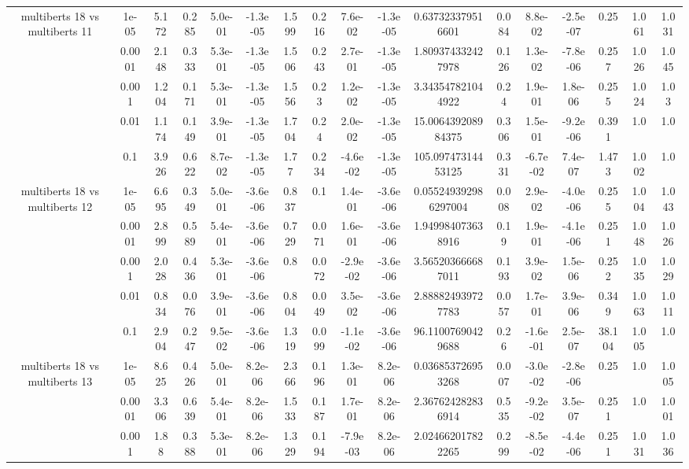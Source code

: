 \begin{tabular}{|c|c|c|c|c|c|c|c|c|c|c|c|c|c|c|c|c|}
\hline
\multirow{5}{*}{multiberts 18 vs multiberts 11} & 1e-05 & 5.172 & 0.285 & 5.0e-01 & -1.3e-05 & 1.599 & 0.216 & 7.6e-02 & -1.3e-05 & 0.637323379516601 & 0.084 & 8.8e-02 & -2.5e-07 & 0.25 & 1.061 & 1.031 \\
 & 0.0001 & 2.148 & 0.333 & 5.3e-01 & -1.3e-05 & 1.506 & 0.243 & 2.7e-01 & -1.3e-05 & 1.809374332427978 & 0.126 & 1.3e-02 & -7.8e-06 & 0.257 & 1.026 & 1.045 \\
 & 0.001 & 1.204 & 0.171 & 5.3e-01 & -1.3e-05 & 1.556 & 0.23 & 1.2e-02 & -1.3e-05 & 3.343547821044922 & 0.24 & 1.9e-01 & 1.8e-06 & 0.255 & 1.024 & 1.03 \\
 & 0.01 & 1.174 & 0.149 & 3.9e-01 & -1.3e-05 & 1.704 & 0.24 & 2.0e-02 & -1.3e-05 & 15.006439208984375 & 0.306 & 1.5e-01 & -9.2e-06 & 0.391 & 1.0 & 1.0 \\
 & 0.1 & 3.926 & 0.622 & 8.7e-02 & -1.3e-05 & 1.77 & 0.234 & -4.6e-02 & -1.3e-05 & 105.09747314453125 & 0.331 & -6.7e-02 & 7.4e-07 & 1.473 & 1.002 & 1.0 \\
\hline
\multirow{5}{*}{multiberts 18 vs multiberts 12} & 1e-05 & 6.695 & 0.349 & 5.0e-01 & -3.6e-06 & 0.837 & 0.1 & 1.4e-01 & -3.6e-06 & 0.055249392986297004 & 0.008 & 2.9e-02 & -4.0e-06 & 0.255 & 1.004 & 1.043 \\
 & 0.0001 & 2.899 & 0.589 & 5.4e-01 & -3.6e-06 & 0.729 & 0.071 & 1.6e-01 & -3.6e-06 & 1.949984073638916 & 0.19 & 1.9e-01 & -4.1e-06 & 0.251 & 1.048 & 1.026 \\
 & 0.001 & 2.028 & 0.436 & 5.3e-01 & -3.6e-06 & 0.8 & 0.072 & -2.9e-02 & -3.6e-06 & 3.565203666687011 & 0.193 & 3.9e-02 & 1.5e-06 & 0.252 & 1.035 & 1.029 \\
 & 0.01 & 0.834 & 0.076 & 3.9e-01 & -3.6e-06 & 0.804 & 0.049 & 3.5e-02 & -3.6e-06 & 2.888824939727783 & 0.057 & 1.7e-01 & 3.9e-06 & 0.349 & 1.063 & 1.011 \\
 & 0.1 & 2.904 & 0.247 & 9.5e-02 & -3.6e-06 & 1.319 & 0.099 & -1.1e-02 & -3.6e-06 & 96.11007690429688 & 0.26 & -1.6e-01 & 2.5e-07 & 38.104 & 1.005 & 1.0 \\
\hline
\multirow{5}{*}{multiberts 18 vs multiberts 13} & 1e-05 & 8.625 & 0.426 & 5.0e-01 & 8.2e-06 & 2.366 & 0.196 & 1.3e-01 & 8.2e-06 & 0.036853726953268 & 0.007 & -3.0e-02 & -2.8e-06 & 0.25 & 1.0 & 1.005 \\
 & 0.0001 & 3.306 & 0.639 & 5.4e-01 & 8.2e-06 & 1.533 & 0.187 & 1.7e-01 & 8.2e-06 & 2.367624282836914 & 0.535 & -9.2e-02 & 3.5e-07 & 0.251 & 1.0 & 1.001 \\
 & 0.001 & 1.88 & 0.388 & 5.3e-01 & 8.2e-06 & 1.329 & 0.194 & -7.9e-03 & 8.2e-06 & 2.024662017822265 & 0.299 & -8.5e-02 & -4.4e-06 & 0.251 & 1.031 & 1.036 \\

\end{tabular}
